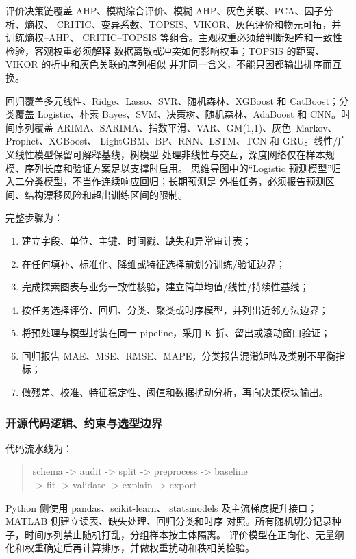 \documentclass[UTF8,a4paper,12pt]{ctexart}
\begin{document}
评价决策链覆盖 AHP、模糊综合评价、模糊 AHP、灰色关联、PCA、因子分析、熵权、
CRITIC、变异系数、TOPSIS、VIKOR、灰色评价和物元可拓，并训练熵权--AHP、
CRITIC--TOPSIS 等组合。主观权重必须给判断矩阵和一致性检验，客观权重必须解释
数据离散或冲突如何影响权重；TOPSIS 的距离、VIKOR 的折中和灰色关联的序列相似
并非同一含义，不能只因都输出排序而互换。

回归覆盖多元线性、Ridge、Lasso、SVR、随机森林、XGBoost 和 CatBoost；分类覆盖
Logistic、朴素 Bayes、SVM、决策树、随机森林、AdaBoost 和 CNN。时间序列覆盖
ARIMA、SARIMA、指数平滑、VAR、GM(1,1)、灰色--Markov、Prophet、XGBoost、
LightGBM、BP、RNN、LSTM、TCN 和 GRU。线性/广义线性模型保留可解释基线，树模型
处理非线性与交互，深度网络仅在样本规模、序列长度和验证方案足以支撑时启用。
思维导图中的“Logistic 预测模型”归入二分类模型，不当作连续响应回归；长期预测是
外推任务，必须报告预测区间、结构漂移风险和超出训练区间的限制。

完整步骤为：
\begin{enumerate}
  \item 建立字段、单位、主键、时间戳、缺失和异常审计表；
  \item 在任何填补、标准化、降维或特征选择前划分训练/验证边界；
  \item 完成探索图表与业务一致性核验，建立简单均值/线性/持续性基线；
  \item 按任务选择评价、回归、分类、聚类或时序模型，并列出近邻方法边界；
  \item 将预处理与模型封装在同一 pipeline，采用 K 折、留出或滚动窗口验证；
  \item 回归报告 MAE、MSE、RMSE、MAPE，分类报告混淆矩阵及类别不平衡指标；
  \item 做残差、校准、特征稳定性、阈值和数据扰动分析，再向决策模块输出。
\end{enumerate}

\subsubsection{开源代码逻辑、约束与选型边界}

代码流水线为：
\begin{quote}
\small\ttfamily
schema -> audit -> split -> preprocess -> baseline\\
-> fit -> validate -> explain -> export
\end{quote}
Python 侧使用 pandas、scikit-learn、
statsmodels 及主流梯度提升接口；MATLAB 侧建立读表、缺失处理、回归分类和时序
对照。所有随机切分记录种子，时间序列禁止随机打乱，分组样本按主体隔离。
评价模型在正向化、无量纲化和权重确定后再计算排序，并做权重扰动和秩相关检验。
\end{document}
